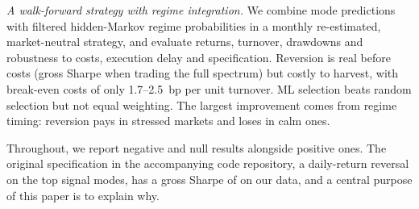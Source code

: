 \emph{A walk-forward strategy with regime integration.} We combine mode
predictions with filtered hidden-Markov regime probabilities in a
monthly re-estimated, market-neutral strategy, and evaluate returns,
turnover, drawdowns and robustness to costs, execution delay and
specification. Reversion is real before costs (gross Sharpe \GSREWB{}
when trading the full spectrum) but costly to harvest, with break-even
costs of only 1.7--2.5~bp per unit turnover. ML selection beats random selection
but not equal weighting. The largest improvement comes from regime
timing: reversion pays in stressed markets and loses in calm ones.

Throughout, we report negative and null results alongside positive
ones. The original specification in the accompanying code repository,
a daily-return reversal on the top signal modes, has a gross Sharpe of
\GSROrig{} on our data, and a central purpose of this paper is to
explain why.
